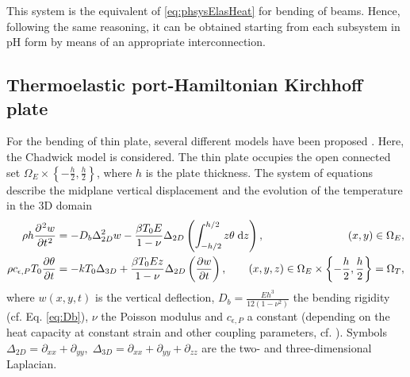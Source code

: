This system is the equivalent of \eqref{eq:phsysElasHeat} for bending of beams. Hence, following the same reasoning, it can be obtained starting from each subsystem in pH form by means of an appropriate interconnection.
\subsection{Thermoelastic port-Hamiltonian Kirchhoff plate}
For the bending of thin plate, several different models have been proposed \cite{chadwick1962propagation,lagnese1989,simmonds1999,norris2006}. Here, the Chadwick model \cite{chadwick1962propagation} is considered. The thin plate occupies the open connected set $\Omega_E \times \left\{-\frac{h}{2}, \frac{h}{2}\right\}$, where $h$ is the plate thickness. The system of equations describe the midplane vertical displacement and the evolution of the temperature in the 3D domain
\begin{equation}\label{eq:heatplate}
\begin{aligned}
\rho h \diffp[2]{w}{t} &= -D_b \Delta^2_{2D} w - \frac{\beta T_0 E}{1 - \nu} \Delta_{2D} \left(\int_{-h/2}^{h/2} z \theta \d{z}\right), \qquad\qquad\qquad\quad\;\, \ (x, y)\in \Omega_E,\\
\rho c_{\epsilon, P} T_0 \diffp{\theta}{t} &= - k T_0 \Delta_{3D} + \frac{\beta T_0 E z}{1-\nu}  \Delta_{2D} \left(\diffp{w}{t}\right), \qquad (x, y, z)\in \Omega_E \times \left\{-\frac{h}{2}, \frac{h}{2}  \right\} = \Omega_T,
\end{aligned}
\end{equation} 
where $w(x,y,t)$ is the vertical deflection, $D_b = \frac{E h^3}{12(1-\nu^2)}$ the bending rigidity (cf. Eq. \eqref{eq:Db}), $\nu$ the Poisson modulus and $c_{\epsilon, P}$ a constant (depending on the heat capacity at constant strain and other coupling parameters, cf. \cite{chadwick1962propagation}). Symbols $\Delta_{2D} = \partial_{xx} + \partial_{yy}, \; \Delta_{3D} = \partial_{xx} + \partial_{yy} + \partial_{zz}$ are the two- and three-dimensional Laplacian. \\

